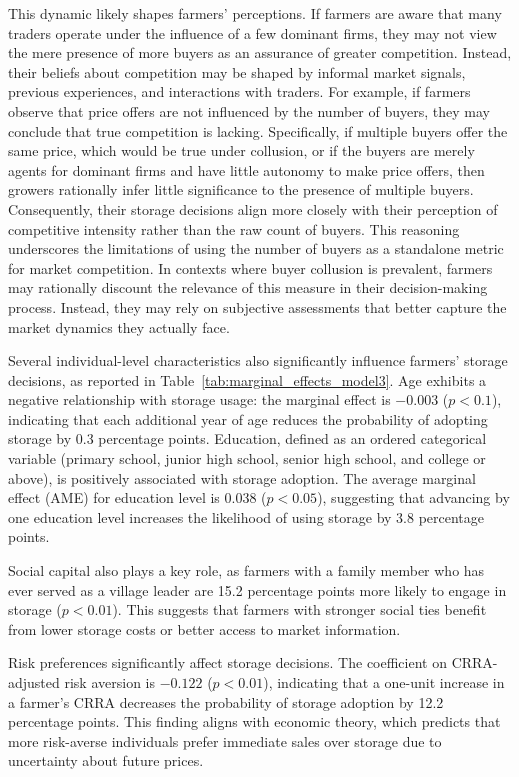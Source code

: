 This dynamic likely shapes farmers' perceptions. If farmers are aware that many traders operate under the influence of a few dominant firms, they may not view the mere presence of more buyers as an assurance of greater competition. Instead, their beliefs about competition may be shaped by informal market signals, previous experiences, and interactions with traders. For example, if farmers observe that price offers are not influenced by the number of buyers, they may conclude that true competition is lacking. Specifically, if multiple buyers offer the same price, which would be true under collusion, or if the buyers are merely agents for dominant firms and have little autonomy to make price offers, then growers rationally infer little significance to the presence of multiple buyers. Consequently, their storage decisions align more closely with their perception of competitive intensity rather than the raw count of buyers. This reasoning underscores the limitations of using the number of buyers as a standalone metric for market competition. In contexts where buyer collusion is prevalent, farmers may rationally discount the relevance of this measure in their decision-making process. Instead, they may rely on subjective assessments that better capture the market dynamics they actually face.  


Several individual-level characteristics also significantly influence farmers' storage decisions, as reported in Table~\ref{tab:marginal_effects_model3}. Age exhibits a negative relationship with storage usage: the marginal effect is \(-0.003\) (\(p<0.1\)), indicating that each additional year of age reduces the probability of adopting storage by 0.3 percentage points. Education, defined as an ordered categorical variable (primary school, junior high school, senior high school, and college or above), is positively associated with storage adoption. The average marginal effect (AME) for education level is 0.038 (\(p<0.05\)), suggesting that advancing by one education level increases the likelihood of using storage by 3.8 percentage points.


Social capital also plays a key role, as farmers with a family member who has ever served as a village leader are 15.2 percentage points more likely to engage in storage (\(p<0.01\)). This suggests that farmers with stronger social ties benefit from lower storage costs or better access to market information.

Risk preferences significantly affect storage decisions. The coefficient on CRRA-adjusted risk aversion is \(-0.122\) (\(p<0.01\)), indicating that a one-unit increase in a farmer's CRRA decreases the probability of storage adoption by 12.2 percentage points. This finding aligns with economic theory, which predicts that more risk-averse individuals prefer immediate sales over storage due to uncertainty about future prices.

